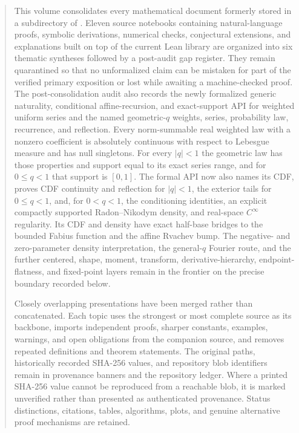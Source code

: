 \documentclass[11pt,oneside]{article}
\theoremstyle{definition}
\theoremstyle{remark}
\begin{document}
\maketitle

\begin{abstract}
This volume consolidates every mathematical document formerly stored in a subdirectory of
.  Eleven source
notebooks containing natural-language proofs, symbolic derivations, numerical checks,
conjectural extensions, and explanations built on top of the current Lean library are
organized into six thematic syntheses followed by a post-audit gap register.  They remain
quarantined so that no unformalized claim can be mistaken for part of the verified primary
exposition or lost while awaiting a machine-checked proof.
The post-consolidation audit also records the newly formalized generic naturality,
conditional affine-recursion, and exact-support API for weighted uniform series and the named
geometric-\(q\) weights, series, probability law, recurrence, and reflection.  Every
norm-summable real weighted law with a nonzero coefficient is absolutely continuous with
respect to Lebesgue measure and has null singletons.  For every \(|q|<1\) the geometric law
has those properties and support equal to its exact series range, and for \(0\le q<1\) that
support is \([0,1]\).  The formal API now also names its CDF, proves CDF continuity and
reflection for \(|q|<1\), the exterior tails for \(0\le q<1\), and, for \(0<q<1\), the
conditioning identities, an explicit compactly supported Radon--Nikodym density, and
real-space \(C^\infty\) regularity.  Its CDF and density have exact half-base bridges to the
bounded Fabius function and the affine Rvachev bump.  The negative- and zero-parameter
density interpretation, the general-\(q\) Fourier route, and the further centered, shape,
moment, transform, derivative-hierarchy, endpoint-flatness, and fixed-point layers remain in
the frontier on the precise boundary recorded below.

Closely overlapping presentations have been merged rather than concatenated.  Each topic
uses the strongest or most complete source as its backbone, imports independent proofs,
sharper constants, examples, warnings, and open obligations from the companion source, and
removes repeated definitions and theorem statements.  The original paths, historically
recorded SHA-256 values, and repository blob identifiers remain in provenance banners and
the repository ledger.  Where a printed SHA-256 value cannot be reproduced from a reachable
blob, it is marked unverified rather than presented as authenticated provenance.  Status
distinctions, citations, tables, algorithms, plots, and genuine alternative proof mechanisms
are retained.
\end{abstract}
\end{document}
